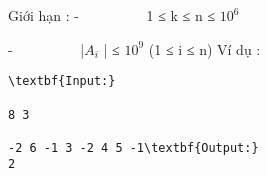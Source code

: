 Giới hạn :  
-          1 ≤ k ≤ n ≤ $10^{6}$

   -          |$A_{i}$   | ≤ $10^{9}$   (1 ≤ i ≤ n)
   Ví dụ :  
\begin{verbatim}
\textbf{Input:}

8 3

-2 6 -1 3 -2 4 5 -1\textbf{Output:}
2\end{verbatim}